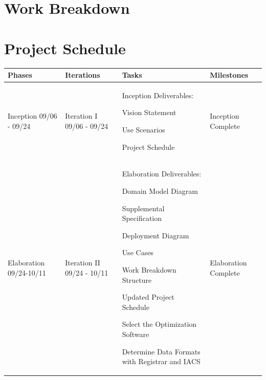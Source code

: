 \documentclass[11pt]{article}
\newenvironment{packed_itemize}{
\begin{itemize}
  \setlength{\itemsep}{1pt}
  \setlength{\parskip}{0pt}
  \setlength{\parsep}{0pt}
}{\end{itemize}}
\begin{document}
\section{Work Breakdown} %




\clearpage
\section{Project Schedule}  %

\begin{tabular}{|m{0.9in}|m{0.9in}|m{4in}|m{.8in}|}
\hline
\textbf{Phases}  & \textbf{Iterations}  & \textbf{Tasks}        & \textbf{Milestones} \\
\hline\hline
Inception 09/06 - 09/24 &
Iteration I 09/06 - 09/24 & \vspace{0.1in}
Inception Deliverables:
	 \begin{packed_itemize}
	\vspace{-0.15in}
		\item Vision Statement
		\item Use Scenarios
		\item Project Schedule
	\vspace{-0.15in}
	\end{packed_itemize}
	& Inception Complete\\
\hline
Elaboration 09/24-10/11&
Iteration II 09/24 - 10/11&  \vspace{0.1in}
Elaboration Deliverables:
	 \begin{packed_itemize}
	\vspace{-0.15in}
		\item Domain Model Diagram
		\item Supplemental Specification
		\item Deployment Diagram
		\item Use Cases
		\item Work Breakdown Structure
		\item Updated Project Schedule
   \end{packed_itemize}


Select the Optimization Software

Determine Data Formats with Registrar and IACS
& Elaboration Complete
\\
\hline


\end{tabular}
\end{document}
